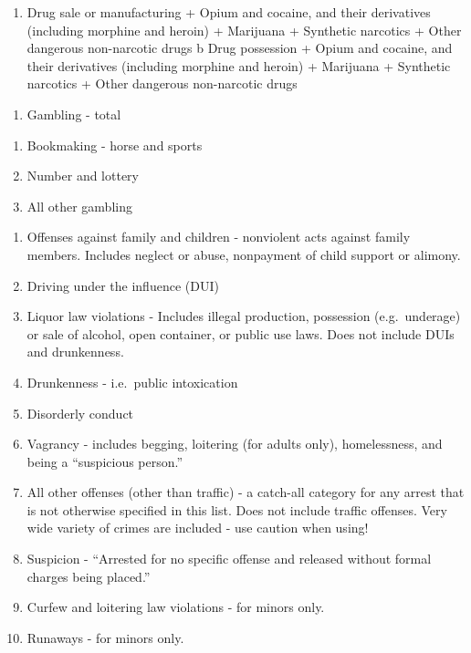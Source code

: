 \documentclass[
]{krantz}
\providecommand{\tightlist}{%
  \setlength{\itemsep}{0pt}\setlength{\parskip}{0pt}}
\begin{document}
\begin{enumerate}
\def\labelenumi{\alph{enumi}.}
\tightlist
\item
  Drug sale or manufacturing + Opium and cocaine, and their
  derivatives (including morphine and heroin) + Marijuana +
  Synthetic narcotics + Other dangerous non-narcotic drugs b
  Drug possession + Opium and cocaine, and their derivatives
  (including morphine and heroin) + Marijuana + Synthetic
  narcotics + Other dangerous non-narcotic drugs
\end{enumerate}

\begin{enumerate}
\def\labelenumi{\arabic{enumi}.}
\setcounter{enumi}{18}
\tightlist
\item
  Gambling - total
\end{enumerate}

\begin{enumerate}
\def\labelenumi{\alph{enumi}.}
\tightlist
\item
  Bookmaking - horse and sports
\item
  Number and lottery
\item
  All other gambling
\end{enumerate}

\begin{enumerate}
\def\labelenumi{\arabic{enumi}.}
\setcounter{enumi}{19}
\tightlist
\item
  Offenses against family and children - nonviolent acts
  against family members. Includes neglect or abuse,
  nonpayment of child support or alimony.
\item
  Driving under the influence (DUI)
\item
  Liquor law violations - Includes illegal production,
  possession (e.g.~underage) or sale of alcohol, open
  container, or public use laws. Does not include DUIs and
  drunkenness.
\item
  Drunkenness - i.e.~public intoxication
\item
  Disorderly conduct
\item
  Vagrancy - includes begging, loitering (for adults only),
  homelessness, and being a ``suspicious person.''
\item
  All other offenses (other than traffic) - a catch-all
  category for any arrest that is not otherwise specified in
  this list. Does not include traffic offenses. Very wide
  variety of crimes are included - use caution when using!
\item
  Suspicion - ``Arrested for no specific offense and
  released without formal charges being placed.''
\item
  Curfew and loitering law violations - for minors only.
\item
  Runaways - for minors only.
\end{enumerate}
\end{document}
